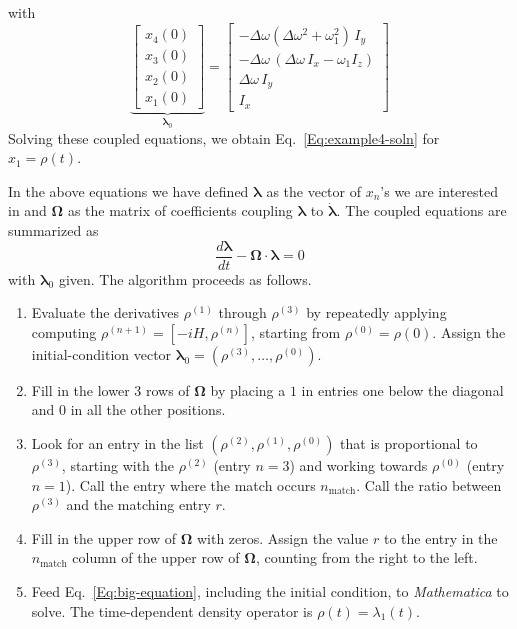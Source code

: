with
\begin{equation}
\underbrace{\begin{bmatrix} 
x_4(0) \\ x_3(0) \\ x_2(0) \\ x_1(0) 
\end{bmatrix}}_{{\bm{\lambda}}_0}
=
\begin{bmatrix}
	- \Delta\omega (\Delta\omega^2 + \omega_1^2) \, I_y \\
	-\Delta\omega \, (\Delta\omega \, I_x - \omega_1 I_z)  \\
	\Delta \omega \, I_y \\
	I_x 
\end{bmatrix}
\end{equation}
Solving these coupled equations, we obtain Eq.~\ref{Eq:example4-soln} for $x_1 = \rho(t)$.  

In the above equations we have defined $\bm{\lambda}$ as the vector of $x_n$'s we are interested in and $\bm{\Omega}$ as the matrix of coefficients coupling $\bm{\lambda}$ to $\dot{\bm{\lambda}}$.  The coupled equations are summarized as
\begin{equation}
\frac{d \bm{\lambda}}{d t} 
	- \bm{\Omega} \cdot \bm{\lambda} 
	= 0
	\label{Eq:big-equation}
\end{equation} 
with $\bm{\lambda}_0$ given.  The  algorithm proceeds as follows.
\begin{enumerate}

  \item Evaluate the derivatives $\rho^{(1)}$ through $\rho^{(3)}$ by repeatedly applying computing $\rho^{(n+1)} = [-i H, \rho^{(n)}]$, starting from $\rho^{(0)} = \rho(0)$.  Assign the initial-condition vector ${\bm{\lambda}}_0 = (\rho^{(3)}, \ldots, \rho^{(0)})$.
  
  \item Fill in the lower 3 rows of $\bm{\Omega}$ by placing a $1$ in entries one below the diagonal and $0$ in all the other positions.
  
  \item  Look for an entry in the list $(\rho^{(2)}, \rho^{(1)}, \rho^{(0)})$ that is proportional to $\rho^{(3)}$, starting with the $\rho^{(2)}$ (entry $n = 3$) and working towards $\rho^{(0)}$ (entry $n = 1$). Call the entry where the match occurs $n_{\text{match}}$. Call the ratio between $\rho^{(3)}$ and the matching entry $r$.
  
  \item Fill in the upper row of $\bm{\Omega}$ with zeros.  Assign the value $r$ to the entry in the $n_{\text{match}}$ column of the upper row of $\bm{\Omega}$, counting from the right to the left.  
  
  \item Feed Eq.~\ref{Eq:big-equation}, including the initial condition, to \emph{Mathematica} to solve.  The time-dependent density operator is $\rho(t) = \lambda_{1}(t)$. 

\end{enumerate}
	